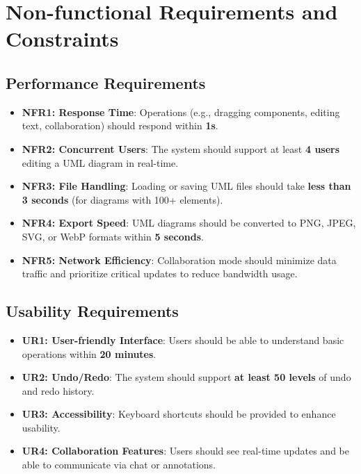\documentclass[12pt]{article}
\begin{document}


\section{Non-functional Requirements and Constraints}
\subsection{Performance Requirements}
\begin{itemize}
    \item \textbf{NFR1: Response Time}: Operations (e.g., dragging components, editing text, collaboration) should respond within \textbf{1s}.
    \item \textbf{NFR2: Concurrent Users}: The system should support at least \textbf{4 users} editing a UML diagram in real-time.
    \item \textbf{NFR3: File Handling}: Loading or saving UML files should take \textbf{less than 3 seconds} (for diagrams with 100+ elements).
    \item \textbf{NFR4: Export Speed}: UML diagrams should be converted to PNG, JPEG, SVG, or WebP formats within \textbf{5 seconds}.
    \item \textbf{NFR5: Network Efficiency}: Collaboration mode should minimize data traffic and prioritize critical updates to reduce bandwidth usage.
\end{itemize}
\subsection{Usability Requirements}
\begin{itemize}
    \item \textbf{UR1: User-friendly Interface}: Users should be able to understand basic operations within \textbf{20 minutes}.
    \item \textbf{UR2: Undo/Redo}: The system should support \textbf{at least 50 levels} of undo and redo history.
    \item \textbf{UR3: Accessibility}: Keyboard shortcuts should be provided to enhance usability.
    \item \textbf{UR4: Collaboration Features}: Users should see real-time updates and be able to communicate via chat or annotations.
\end{itemize}
\end{document}
